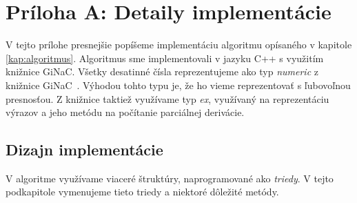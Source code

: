 \chapter*{Príloha A: Detaily implementácie}
\label{kap:prilohaA}

V tejto prílohe presnejšie popíšeme implementáciu algoritmu opísaného v kapitole \ref{kap:algoritmus}.
Algoritmus sme implementovali v jazyku C++ s využitím knižnice GiNaC. Všetky desatinné čísla
reprezentujeme ako typ \textit{numeric} z knižnice GiNaC~\cite{bauer2002introduction}. Výhodou tohto typu je, že ho vieme 
reprezentovať s ľubovoľnou presnosťou. Z knižnice taktiež využívame typ \textit{ex}, využívaný na 
reprezentáciu výrazov a jeho metódu na počítanie parciálnej derivácie.

\section{Dizajn implementácie}

V algoritme využívame viaceré štruktúry, naprogramované ako \textit{triedy}. V tejto podkapitole
vymenujeme tieto triedy a niektoré dôležité metódy.

